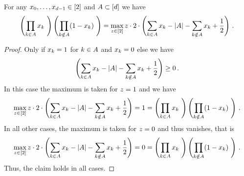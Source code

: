 \begin{lemma}\label{lem:monomialToQUBO}
	For any ${x_{0},\ldots,x_{d-1}}\in[2]$ and $A\subset[d]$ we have 
		\[ \left( \prod_{\atomenumerator\in\variableset} \atomlegindexof{\atomenumerator } \right)  \left(  \prod_{\atomenumerator\notin\variableset} (1- \atomlegindexof{\atomenumerator }) \right)
		=
		\max_{\slackvariable\in[2]} \slackvariable \cdot 2 \cdot \left( \sum_{\atomenumerator\in\variableset}\atomlegindexof{\atomenumerator}  - \cardof{\variableset} - \sum_{\atomenumerator\notin\variableset}\atomlegindexof{\atomenumerator} + \frac{1}{2} \right) \, . %
 		\]
\end{lemma}
\begin{proof} %
	Only if $x_{k}=1$ for $k\in A$ and $x_{k}=0$ else we have
		\[ \left( \sum_{k\in A}x_{k}  - \left|A\right| - \sum_{k\notin A}x_{k} + \frac{1}{2} \right) \geq 0 \, . \]
	In this case the maximum is taken for $z=1$ and we have
		\[ \max_{\slackvariable\in[2]} \slackvariable \cdot 2 \cdot \left( \sum_{\atomenumerator\in\variableset}\atomlegindexof{\atomenumerator}  - \cardof{\variableset} - \sum_{\atomenumerator\notin\variableset}\atomlegindexof{\atomenumerator} + \frac{1}{2} \right) 
		= 1 = \left( \prod_{\atomenumerator\in\variableset} \atomlegindexof{\atomenumerator } \right)  \left(  \prod_{\atomenumerator\notin\variableset} (1- \atomlegindexof{\atomenumerator }) \right) \, . \]
	In all other cases, the maximum is taken for $z=0$ and thus vanishes, that is 
		\[ \max_{\slackvariable\in[2]} \slackvariable \cdot 2 \cdot \left( \sum_{\atomenumerator\in\variableset}\atomlegindexof{\atomenumerator}  - \cardof{\variableset} - \sum_{\atomenumerator\notin\variableset}\atomlegindexof{\atomenumerator} + \frac{1}{2} \right) 
		= 0 = \left( \prod_{\atomenumerator\in\variableset} \atomlegindexof{\atomenumerator } \right)  \left(  \prod_{\atomenumerator\notin\variableset} (1- \atomlegindexof{\atomenumerator }) \right) \, . \]
	Thus, the claim holds in all cases.
\end{proof}	





